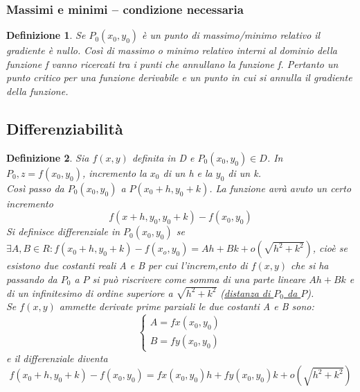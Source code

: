 \documentclass{book}
\newtheorem{defi}{Definizione}
\begin{document}
\subsubsection{Massimi e minimi -- condizione necessaria}
\begin{defi}
  Se $P_0(x_0,y_0)$ è un punto di massimo/minimo relativo il gradiente è nullo. Così di massimo
  o minimo relativo interni al dominio della funzione f vanno ricercati tra i punti che annullano
  la funzione f. Pertanto un punto critico per una funzione derivabile e un punto in cui si
  annulla il gradiente della funzione.
\end{defi}
\subsection{Differenziabilità}
\begin{defi}
  Sia $f(x,y)$ definita in D e $P_0(x_0,y_0)\in D$. In $P_0, z=f(x_0,y_0)$, incremento la $x_0$
  di un h e la $y_0$ di un k.\\
  Così passo da $P_0(x_0,y_0)$ a $P(x_0+h,y_0+k)$. La funzione avrà avuto un certo incremento
  \begin{equation*}
    f(x+h,y_0,y_0+k)-f(x_0,y_0)
  \end{equation*}
  Si definisce {\color{red}differenziale} in $P_0(x_0,y_0)$ se
  $\exists A,B \in R: f(x_0+h,y_0+k)-f(x_o,y_0)=Ah+Bk+o(\sqrt{h^2+k^2})$, cioè se esistono
  due costanti reali A e B per cui l'increm,ento di $f(x,y)$ che si ha passando da $P_0$ a $P$
  si può riscrivere come somma di una parte lineare $Ah+Bk$ e di un infinitesimo di ordine
  superiore a $\sqrt{h^2+k^2}$ (\underline{distanza di $P_0$ da $P$}).\\
  Se $f(x,y)$ ammette derivate prime parziali le due costanti A e B sono:
  \begin{equation*}
    \begin{cases}
      A=fx(x_0,y_0)\\
      B=fy(x_0,y_0)
    \end{cases}
  \end{equation*}
  e il differenziale diventa
  \begin{equation}
    f(x_0+h,y_0+k) - f(x_0,y_0)=fx(x_0,y_0)h+fy(x_0,y_0)k+o(\sqrt{h^2+k^2})
  \end{equation}
\end{defi}
\end{document}
